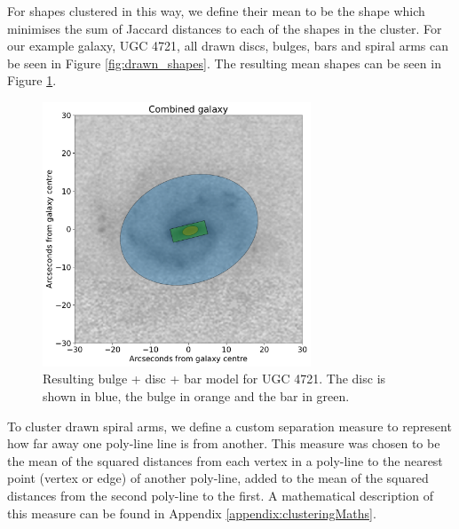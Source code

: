\documentclass[../main.tex]{subfiles}
\begin{document}
For shapes clustered in this way, we define their mean to be the shape which minimises the sum of Jaccard distances to each of the shapes in the cluster. For our example galaxy, UGC 4721, all drawn discs, bulges, bars and spiral arms can be seen in Figure \ref{fig:drawn_shapes}. The resulting mean shapes can be seen in Figure \ref{fig:aggregate_model}.




\begin{figure}
  \includegraphics[width=8cm]{images__method/aggregate_model.pdf}
  \caption{Resulting bulge + disc + bar model for UGC 4721. The disc is shown in blue, the bulge in orange and the bar in green.}
  \label{fig:aggregate_model}
\end{figure}

To cluster drawn spiral arms, we define a custom separation measure to represent how far away one poly-line line is from another. This measure was chosen to be the mean of the squared distances from each vertex in a poly-line to the nearest point (vertex or edge) of another poly-line, added to the mean of the squared distances from the second poly-line to the first. A mathematical description of this measure can be found in Appendix \ref{appendix:clusteringMaths}.
\end{document}
